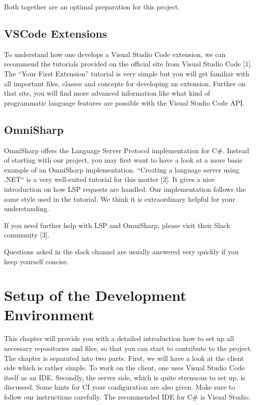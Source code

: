 \documentclass[]{book}
\begin{document}
Both together are an optimal preparation for this project.

\section{VSCode Extensions}\label{vscode-extensions}

To understand how one develops a Visual Studio Code extension, we can recommend the tutorials provided on the official site from Visual Studio Code {[}1{]}. The ``Your First Extension'' tutorial is very simple but you will get familiar with all important files, classes and concepts for developing an extension. Further on that site, you will find more advanced information like what kind of programmatic language features are possible with the Visual Studio Code API.

\section{OmniSharp}\label{omnisharp}

OmniSharp offers the Language Server Protocol implementation for C\#. Instead of starting with our project, you may first want to have a look at a more basic example of an OmniSharp implementation. ``Creating a language server using .NET`` is a very well-suited tutorial for this matter {[}2{]}. It gives a nice introduction on how LSP requests are handled. Our implementation follows the same style used in the tutorial. We think it is extraordinary helpful for your understanding.

If you need further help with LSP and OmniSharp, please visit their Slack community {[}3{]}.

Questions asked in the slack channel are usually answered very quickly if you keep yourself concise.

\chapter{ Setup of the Development Environment}\label{setup-of-the-development-environment}

This chapter will provide you with a detailed introduction how to set up all necessary repositories and files, so that you can start to contribute to the project. The chapter is separated into two parts. First, we will have a look at the client side which is rather simple. To work on the client, one uses Visual Studio Code itself as an IDE. Secondly, the server side, which is quite strenuous to set up, is discussed. Some hints for CI your configuration are also given. Make sure to follow our instructions carefully. The recommended IDE for C\# is Visual Studio.
\end{document}
